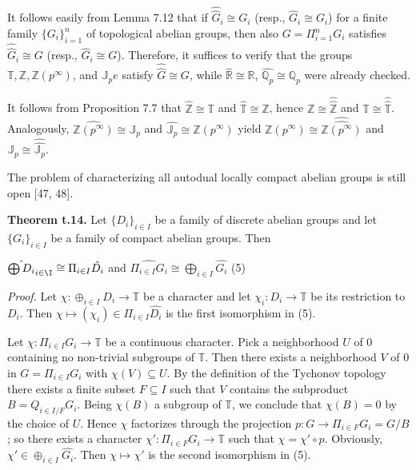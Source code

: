 \documentclass[12pt]{article}
\begin{document}
\begin{itemize}
\begin{itemize}
It follows easily from Lemma 7.12 that if $\hat{\hat{G}}_i \cong G_i$ (resp., $\hat{G}_i \cong G_i$) for a finite family $\{G_i\}^n_{i=1}$ of topological
abelian groups, then also $G = \Pi^n_{i=1} G_i$ satisfies $\hat{\hat{G}}_i \cong G$ (resp., $\hat{G}_i \cong G$). Therefore, it suffices to verify that the
groups $\mathbb{T}, \mathbb{Z}, \mathbb{Z}(p^{\infty})$, and $\mathbb{J}_p e$ satisfy $\hat{\hat{G}} \cong G$, while $\hat{\mathbb{R}} \cong \mathbb{R}$, $\hat{\mathbb{Q}_p} \cong \mathbb{Q}_p$ were already checked.


    It follows from Proposition 7.7 that $\hat{\mathbb{Z}} \cong \mathbb{T}$ and $\hat{\mathbb{T}} \cong \mathbb{Z}$, hence $\mathbb{Z} \cong \hat{\hat{\mathbb{Z}}}$ and $\mathbb{T} \cong \hat{\hat{\mathbb{T}}}$. Analogously, $\hat{\mathbb{Z} (p^{\infty})} \cong \mathbb{J}_p$
and $\hat{\mathbb{J}_p} \cong \mathbb{Z}(p^{\infty})$ yield $\mathbb{Z}(p^{\infty}) \cong \hat{\hat{\mathbb{Z}(p^{\infty})}}$ and $\mathbb{J}_p \cong \hat{\hat{\mathbb{J}_p}}$.


    The problem of characterizing all autodual locally compact abelian groups is still open [47, 48].


\textbf{Theorem t.14.} Let $\{D_i\}_{i \in I}$ be a family of discrete abelian groups and let $\{G_i\}_{i \in I}$ be a family of compact
abelian groups. Then


    $\hat{\bigoplus D_i}_{i \in \I} \cong \Pi_{i \in I} \hat{D_i}$ and $\hat{\Pi_{i \in I} G_i} \cong \bigoplus_{i \in I} \hat{G_i}$ (5)


\emph{Proof.} Let $\chi : \oplus_{i \in I} D_i \to \mathbb{T}$ be a character and let $\chi_i: D_i \to \mathbb{T}$ be its restriction to $D_i$. Then $\chi \mapsto (\chi_i) \in \Pi_{i \in I} \hat{D_i}$
is the first isomorphism in (5).


    Let $\chi : \Pi_{i \in I} G_i \to \mathbb{T}$ be a continuous character. Pick a neighborhood $U$ of 0 containing no non-trivial
subgroups of $\mathbb{T}$. Then there exists a neighborhood $V$ of 0 in $G = \Pi_{i \in I} G_i$ with $\chi(V) \subseteq U$. By the definition of
the Tychonov topology there exists a finite subset $F \subseteq I$ such that $V$ contains the subproduct $B = Q_{i \in I/F} G_i$.
Being $\chi(B)$ a subgroup of $\mathbb{T}$, we conclude that $\chi(B) = 0$ by the choice of $U$. Hence $\chi$ factorizes through the
projection $p : G \to \Pi_{i \in F} G_i = G/B$; so there exists a character $\chi' : \Pi_{i \in F} G_i \to \mathbb{T}$ such that $\chi = \chi' \circ p$.
Obviously, $\chi' \in \oplus_{i \in I} \hat{G_i}$. Then $\chi \mapsto \chi'$ is the second isomorphism in (5).



\end{itemize}
\end{itemize}
\end{document}
